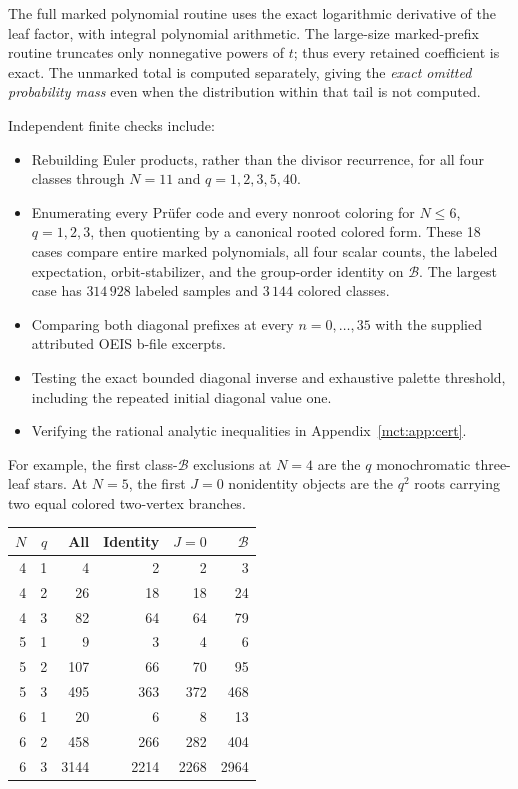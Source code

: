 \documentclass[11pt]{article}
\theoremstyle{definition}
\newcommand{\classB}{\mathcal B}
\begin{document}
The full marked polynomial routine uses the exact logarithmic derivative of the leaf factor, with integral polynomial arithmetic. The large-size marked-prefix routine truncates only nonnegative powers of $t$; thus every retained coefficient is exact. The unmarked total is computed separately, giving the \emph{exact omitted probability mass} even when the distribution within that tail is not computed.

Independent finite checks include:
\begin{itemize}
\item Rebuilding Euler products, rather than the divisor recurrence, for all four classes through $N=11$ and $q=1,2,3,5,40$.
\item Enumerating every Pr\"ufer code and every nonroot coloring for $N\le6$, $q=1,2,3$, then quotienting by a canonical rooted colored form. These 18 cases compare entire marked polynomials, all four scalar counts, the labeled expectation, orbit-stabilizer, and the group-order identity on $\classB$. The largest case has $314\,928$ labeled samples and $3\,144$ colored classes.
\item Comparing both diagonal prefixes at every $n=0,\ldots,35$ with the supplied attributed OEIS b-file excerpts.
\item Testing the exact bounded diagonal inverse and exhaustive palette threshold, including the repeated initial diagonal value one.
\item Verifying the rational analytic inequalities in Appendix~\ref{mct:app:cert}.
\end{itemize}
For example, the first class-$\classB$ exclusions at $N=4$ are the $q$ monochromatic three-leaf stars. At $N=5$, the first $J=0$ nonidentity objects are the $q^2$ roots carrying two equal colored two-vertex branches.

\begin{center}
\begin{tabular}{rrrrrr}
\toprule
$N$ & $q$ & All & Identity & $J=0$ & $\classB$\\
\midrule
4&1&4&2&2&3\\
4&2&26&18&18&24\\
4&3&82&64&64&79\\
5&1&9&3&4&6\\
5&2&107&66&70&95\\
5&3&495&363&372&468\\
6&1&20&6&8&13\\
6&2&458&266&282&404\\
6&3&3144&2214&2268&2964\\
\bottomrule
\end{tabular}
\end{center}
\end{document}
